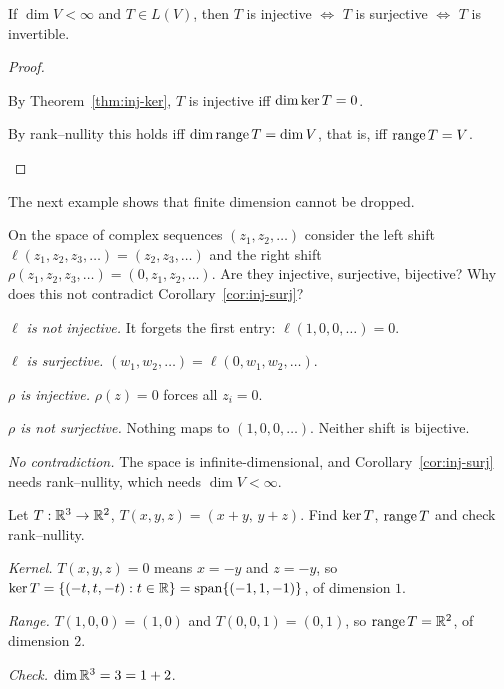 \begin{corollary}\label{cor:inj-surj}
  If $\dim V<\infty$ and $T\in L(V)$, then $T$ is injective $\iff$ $T$ is surjective $\iff$ $T$ is invertible.
\end{corollary}
\begin{proof}
  \begin{steps}
    \item By Theorem~\ref{thm:inj-ker}, $T$ is injective iff $\dim\operatorname{ker} T=0$.
    \item By rank--nullity this holds iff $\dim\operatorname{range} T=\dim V$, that is, iff $\operatorname{range} T=V$. \qedhere
  \end{steps}
\end{proof}

The next example shows that finite dimension cannot be dropped.

\begin{example}\label{ex:shifts}
  On the space of complex sequences $(z_1,z_2,\dots)$ consider the left shift $\ell(z_1,z_2,z_3,\dots)=(z_2,z_3,\dots)$ and the right shift $\rho(z_1,z_2,z_3,\dots)=(0,z_1,z_2,\dots)$. Are they injective, surjective, bijective? Why does this not contradict Corollary~\ref{cor:inj-surj}?
\end{example}
\begin{solution}
  \begin{steps}
    \item \emph{$\ell$ is not injective.} It forgets the first entry: $\ell(1,0,0,\dots)=0$.
    \item \emph{$\ell$ is surjective.} $(w_1,w_2,\dots)=\ell(0,w_1,w_2,\dots)$.
    \item \emph{$\rho$ is injective.} $\rho(z)=0$ forces all $z_i=0$.
    \item \emph{$\rho$ is not surjective.} Nothing maps to $(1,0,0,\dots)$. Neither shift is bijective.
    \item \emph{No contradiction.} The space is infinite-dimensional, and Corollary~\ref{cor:inj-surj} needs rank--nullity, which needs $\dim V<\infty$.
  \end{steps}
\end{solution}

\begin{example}\label{ex:ranknull}
  Let $T:\mathbb{R}^3\to\mathbb{R}^2$, $T(x,y,z)=(x+y,\,y+z)$. Find $\operatorname{ker} T$, $\operatorname{range} T$ and check rank--nullity.
\end{example}
\begin{solution}
  \begin{steps}
    \item \emph{Kernel.} $T(x,y,z)=0$ means $x=-y$ and $z=-y$, so $\operatorname{ker} T=\{(-t,t,-t):t\in\mathbb{R}\}=\operatorname{span}\{(-1,1,-1)\}$, of dimension $1$.
    \item \emph{Range.} $T(1,0,0)=(1,0)$ and $T(0,0,1)=(0,1)$, so $\operatorname{range} T=\mathbb{R}^2$, of dimension $2$.
    \item \emph{Check.} $\dim\mathbb{R}^3=3=1+2$.
  \end{steps}
\end{solution}

